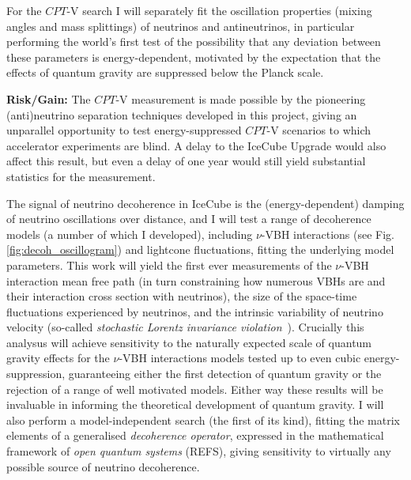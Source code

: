 \documentclass[a4paper,11pt]{article}
\begin{document}
For the $CPT$-V search I will separately fit the oscillation properties (mixing angles and mass splittings) of neutrinos and antineutrinos, in particular performing the world's first test of the possibility that any deviation between these parameters is energy-dependent, motivated by the expectation that the effects of quantum gravity are suppressed below the Planck scale.

\textbf{Risk/Gain:} The $CPT$-V measurement is made possible by the pioneering (anti)neutrino separation techniques developed in this project, giving an unparallel opportunity to test energy-suppressed $CPT$-V scenarios to which accelerator experiments are blind. A delay to the IceCube Upgrade would also affect this result, but even a delay of one year would still yield substantial statistics for the measurement.

The signal of neutrino decoherence in IceCube is the (energy-dependent) damping of neutrino oscillations over distance, and I will test a range of decoherence models (a number of which I developed), including $\nu$-VBH interactions (see Fig. \ref{fig:decoh_oscillogram}) and lightcone fluctuations, fitting the underlying model parameters. This work will yield the first ever measurements of the $\nu$-VBH interaction mean free path (in turn constraining how numerous VBHs are and their interaction cross section with neutrinos), the size of the space-time fluctuations experienced by neutrinos, and the intrinsic variability of neutrino velocity (so-called \textit{stochastic Lorentz invariance violation}~\cite{Vasileiou2015, Amelino-Camelia:2016fuh}). Crucially this analysus will achieve sensitivity to the naturally expected scale of quantum gravity effects for the $\nu$-VBH interactions models tested up to even cubic energy-suppression, guaranteeing either the first detection of quantum gravity or the rejection of a range of well motivated models. Either way these results will be invaluable in informing the theoretical development of quantum gravity. I will also perform a model-independent search (the first of its kind), fitting the matrix elements of a generalised \textit{decoherence operator}, expressed in the mathematical framework of \textit{open quantum systems} (REFS), giving sensitivity to virtually any possible source of neutrino decoherence. 

\end{document}
